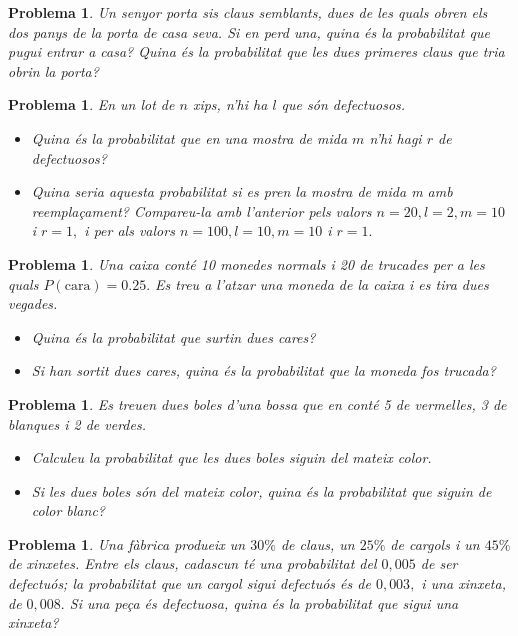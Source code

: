 \documentclass[11pt]{article}
\newcounter{prbcont}
\newtheorem{problema}[prbcont]{Problema}
\begin{document}
\begin{problema}
Un senyor porta sis claus semblants, dues de les quals obren els dos panys de la porta de casa seva. Si en perd una, quina \'es la probabilitat que pugui entrar a casa? Quina \'es la
probabilitat que les dues primeres claus que tria obrin la porta?
\end{problema}

\begin{problema}
En un lot de $n$ xips, n'hi ha $l$ que s\'on defectuosos.
\begin{itemize}
\item [(a)] Quina \'es la probabilitat que en una mostra de mida $m$ n'hi hagi $r$ de defectuosos?
\item [(b)] Quina seria aquesta probabilitat si es pren la mostra de mida m amb reempla\c{c}ament?       Compareu-la amb l'anterior pels valors $n = 20, l = 2, m = 10 $ i $r = 1,$ i per als valors
$n = 100, l = 10, m = 10$ i $r = 1.$
\end{itemize}
\end{problema}

\begin{problema}
Una caixa cont\'e 10 monedes normals i 20 de trucades per a les quals $P(\text{cara}) = 0.25.$ Es
treu a l'atzar una moneda de la caixa i es tira dues vegades.
\begin{itemize}
\item [(a)] Quina \'es la probabilitat que surtin dues cares?
\item [(b)] Si han sortit dues cares, quina \'es la probabilitat que la moneda fos trucada?
\end{itemize}
\end{problema}

\begin{problema}
Es treuen dues boles d'una bossa que en cont\'e 5 de vermelles, 3 de blanques i 2 de verdes.
\begin{itemize}
\item [(a)] Calculeu la probabilitat que les dues boles siguin del mateix color.
\item [(b)] Si les dues boles s\'on del mateix color, quina \'es la probabilitat que siguin de color blanc?
\end{itemize}
\end{problema}

\begin{problema}
Una f\`abrica produeix un $30\%$ de claus, un $25\%$ de cargols i un $45\%$ de xinxetes. Entre
els claus, cadascun t\'e una probabilitat del $0,005$ de ser defectu\'os; la probabilitat que un cargol sigui defectu\'os \'es de $0,003,$ i una xinxeta, de $0,008.$ Si una pe\c{c}a \'es defectuosa, quina
\'es la probabilitat que sigui una xinxeta?
\end{problema}
\end{document}
